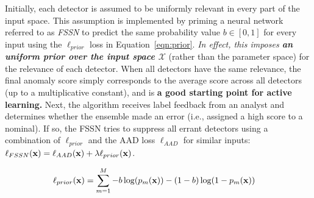 \documentclass{article}
\begin{document}
Initially, each detector is assumed to be uniformly relevant in every part of the input space. This assumption is implemented by priming a neural network referred to as \textit{FSSN} to predict the same probability value $b \in [0, 1]$ for every input using the $\ell_{prior}$ loss in Equation~\ref{eqn:prior}. \textit{In effect, this imposes \textbf{an uniform prior over the input space $\mathcal{X}$}}  (rather than the parameter space) for the relevance of each detector. When all detectors have the same relevance, the final anomaly score simply corresponds to the average score across all detectors (up to a multiplicative constant), and is \textbf{a good starting point for active learning.} Next, the algorithm receives label feedback from an analyst and determines whether the ensemble made an error (i.e., assigned a high score to a nominal). If so, the FSSN tries to suppress all errant detectors using a combination of $\ell_{prior}$ and the AAD loss $\ell_{AAD}$ for similar inputs: $\ell_{FSSN}({\bf x}) = \ell_{AAD}({\bf x}) + \lambda \ell_{prior}({\bf x})$.

\begin{align}
\ell_{prior}({\bf x}) &= \sum_{m=1}^M{-b\log(p_m({\bf x})) -(1 - b)\log(1 - p_m({\bf x}))} \label{eqn:prior}
\end{align}
\end{document}
